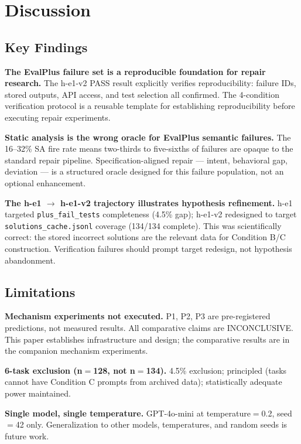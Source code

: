 \section{Discussion}

\subsection{Key Findings}

\textbf{The EvalPlus failure set is a reproducible foundation for repair research.} The
h-e1-v2 PASS result explicitly verifies reproducibility: failure IDs, stored outputs,
API access, and test selection all confirmed. The 4-condition verification protocol
is a reusable template for establishing reproducibility before executing repair
experiments.

\textbf{Static analysis is the wrong oracle for EvalPlus semantic failures.} The 16--32\%
SA fire rate means two-thirds to five-sixths of failures are opaque to the standard
repair pipeline. Specification-aligned repair --- intent, behavioral gap, deviation ---
is a structured oracle designed for this failure population, not an optional enhancement.

\textbf{The h-e1 $\rightarrow$ h-e1-v2 trajectory illustrates hypothesis refinement.} h-e1 targeted
\texttt{plus\_fail\_tests} completeness (4.5\% gap); h-e1-v2 redesigned to target
\texttt{solutions\_cache.jsonl} coverage (134/134 complete). This was scientifically correct:
the stored incorrect solutions are the relevant data for Condition B/C construction.
Verification failures should prompt target redesign, not hypothesis abandonment.

\subsection{Limitations}

\textbf{Mechanism experiments not executed.} P1, P2, P3 are pre-registered predictions,
not measured results. All comparative claims are INCONCLUSIVE. This paper establishes
infrastructure and design; the comparative results are in the companion mechanism
experiments.

\textbf{6-task exclusion (n$=$128, not n$=$134).} 4.5\% exclusion; principled (tasks cannot
have Condition C prompts from archived data); statistically adequate power maintained.

\textbf{Single model, single temperature.} GPT-4o-mini at temperature$=$0.2, seed$=$42 only.
Generalization to other models, temperatures, and random seeds is future work.

